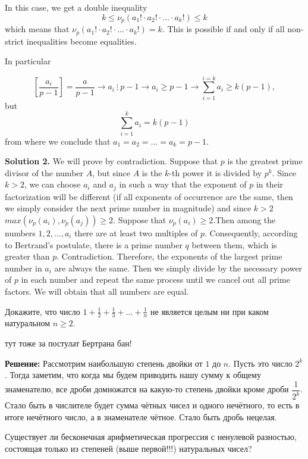     In this case, we get a double inequality  
    \[k \leq \nu_p(a_1! \cdot a_2! \cdot \ldots \cdot a_k!) \leq k\] 
    which means that $\nu_p(a_1! \cdot a_2! \cdot \ldots \cdot a_k!) = k$. This is possible if and only if all non-strict inequalities become equalities. 
    
    In particular
    
    \[\left[ \frac{a_i}{p-1} \right] = \frac{a}{p-1} \longrightarrow a_i \ \vdots \ p-1  \longrightarrow a_i \geq p-1 \longrightarrow \sum^{i=k}_{i=1} a_i \geq k(p-1),\]
    but
    \[\sum^{k}_{i=1} a_i = k(p-1)\]
    from where we conclude that $a_1=a_2=\ldots=a_k=p-1.$

\textbf{Solution 2.}
We will prove by contradiction. Suppose that $p$ is the greatest prime divisor of the number $A$, but since $A$ is the $k$-th power it is divided by $p^{k}.$ Since \( k > 2 \), we can choose \( a_i \) and \( a_j \) in such a way that the exponent of \( p \) in their factorization will be different (if all exponents of occurrence are the same, then we simply consider the next prime number in magnitude) and since $k>2$ $max(\nu_p(a_i), \nu_p(a_j))\geq 2.$  Suppose that $\nu_p(a_i)\geq 2$.Then among the numbers $1, 2, \ldots, a_i$ there are at least two multiples of $p$. Consequently, according to Bertrand's postulate, there is a prime number $q$ between them, which is greater than $p$. Contradiction. Therefore, the exponents of the largest prime number in $a_i$ are always the same. Then we simply divide by the necessary power of $p$ in each number and repeat the same process until we cancel out all prime factors. We will obtain that all numbers are equal.

Докажите, что число $1+\frac{1}{2}+\frac{1}{3}+\ldots+\frac{1}{n}$ не является целым ни при каком натуральном $n \geqslant 2$.

\begin{flushright}
        \scriptsize{тут тоже за постулат Бертрана бан!}
\end{flushright}

\textbf{Решение:}
Рассмотрим наибольшую степень двойки от $1$ до $n$. Пусть это число $2^k$. Тогда заметим, что когда мы будем приводить нашу сумму к общему знаменателю, все дроби домножатся на какую-то степень двойки кроме дроби $\dfrac{1}{2^k}$. Стало быть в числителе будет сумма чётных чисел и одного нечётного, то есть в итоге нечётного число, а в знаменателе чётное. Стало быть дробь нецелая.

Существует ли бесконечная арифметическая прогрессия с ненулевой разностью, состоящая только из степеней (выше первой!!!) натуральных чисел?

